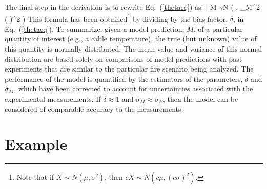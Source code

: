 The final step in the derivation is to rewrite Eq.~(\ref{thetaeq}) as:
\be
   \theta \; | \; M \sim N \left(  \; , \; \widetilde{\sigma}_M^2 \left(  \right)^2 \right) \label{truth}
\ee
This formula has been obtained\footnote{Note that if $X \sim N(\mu,\sigma^2)$, then
$cX \sim N ( c \mu , (c \sigma)^2)$.} by dividing by the bias factor, $\delta$, in Eq.~(\ref{thetaeq}). To summarize, given a model prediction, $M$,
of a particular quantity of interest (e.g., a cable temperature), the true (but unknown) value of this quantity is normally distributed. The mean value
and variance of this normal distribution are based solely on comparisons of model predictions with past experiments that are similar to the particular fire
scenario being analyzed. The performance of the model is quantified by the estimators of the parameters, $\delta$ and $\widetilde{\sigma}_M$, which
have been corrected to account for uncertainties associated with the experimental measurements.
If $\delta \approx 1$ and $\widetilde{\sigma}_M \approx \widetilde{\sigma}_E$, then the
model can be considered of comparable accuracy to the measurements.


\section{Example}

